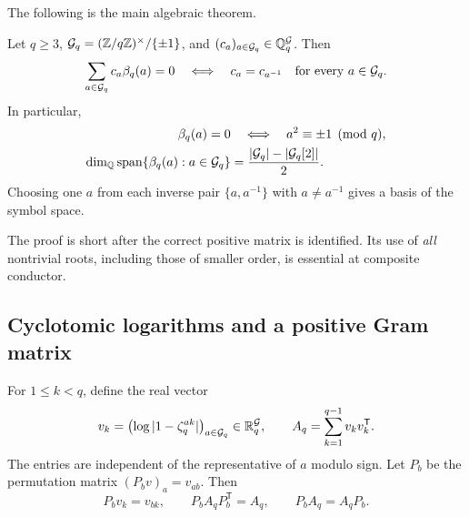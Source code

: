 The following is the main algebraic theorem.

\begin{theorem}\label{hstruct:thm:kernel}
Let $q\ge3$, $\mathcal{G}_q=(\mathbb{Z}/q\mathbb{Z})^\times/\{\pm1\}$, and
$(c_a)_{a\in \mathcal{G}_q}\in\mathbb{Q}^\mathcal{G}_q$. Then
\begin{equation}\label{hstruct:eq:kernel}
 \sum_{a\in \mathcal{G}_q}c_a\beta_q(a)=0
 \quad\Longleftrightarrow\quad
 c_a=c_{a^{-1}}\quad\hbox{for every }a\in \mathcal{G}_q.
\end{equation}
In particular,
\begin{align}
 \beta_q(a)=0&\quad\Longleftrightarrow\quad a^2\equiv\pm1\pmod q,
 \label{hstruct:eq:zero-beta}\\
 \dim_{\mathbb{Q}}\operatorname{span}\{\beta_q(a):a\in \mathcal{G}_q\}
 &=\frac{|\mathcal{G}_q|-|\mathcal{G}_q[2]|}{2}.
 \label{hstruct:eq:rank-beta}
\end{align}
Choosing one $a$ from each inverse pair $\{a,a^{-1}\}$ with
$a\ne a^{-1}$ gives a basis of the symbol space.
\end{theorem}

The proof is short after the correct positive matrix is identified.
Its use of \emph{all} nontrivial roots, including those of smaller order,
is essential at composite conductor.

\subsection{Cyclotomic logarithms and a positive Gram matrix}

For $1\le k<q$, define the real vector
\begin{equation}\label{hstruct:eq:vk}
 v_k=\bigl(\log|1-\zeta_q^{ak}|\bigr)_{a\in \mathcal{G}_q}\in\mathbb R^\mathcal{G}_q,
 \qquad A_q=\sum_{k=1}^{q-1}v_kv_k^{\mathsf T}.
\end{equation}
The entries are independent of the representative of $a$ modulo sign.
Let $P_b$ be the permutation matrix
$(P_bv)_a=v_{ab}$. Then
\begin{equation}\label{hstruct:eq:Gram-equiv}
 P_bv_k=v_{bk},\qquad P_bA_qP_b^{\mathsf T}=A_q,
 \qquad P_bA_q=A_qP_b.
\end{equation}

